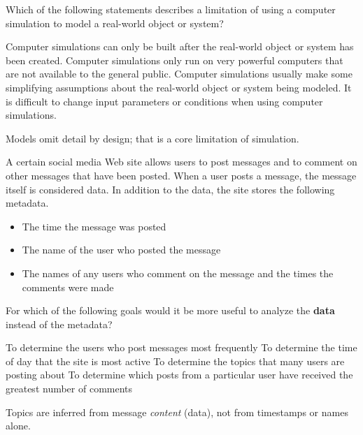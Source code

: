 \question[5]
Which of the following statements describes a limitation of using a computer simulation to model a real-world object or system?
\begin{choices}
  \choice Computer simulations can only be built after the real-world object or system has been created.
  \choice Computer simulations only run on very powerful computers that are not available to the general public.
  \CorrectChoice Computer simulations usually make some simplifying assumptions about the real-world object or system being modeled.
  \choice It is difficult to change input parameters or conditions when using computer simulations.
\end{choices}
\begin{solution}
  Models omit detail by design; that is a core limitation of simulation.
\end{solution}


\question[5]
A certain social media Web site allows users to post messages and to comment on other messages that have been posted. When a user posts a message, the message itself is considered data. In addition to the data, the site stores the following metadata.
\begin{itemize}
  \item The time the message was posted
  \item The name of the user who posted the message
  \item The names of any users who comment on the message and the times the comments were made
\end{itemize}
For which of the following goals would it be more useful to analyze the \textbf{data} instead of the metadata?
\begin{choices}
  \choice To determine the users who post messages most frequently
  \choice To determine the time of day that the site is most active
  \CorrectChoice To determine the topics that many users are posting about
  \choice To determine which posts from a particular user have received the greatest number of comments
\end{choices}
\begin{solution}
  Topics are inferred from message \emph{content} (data), not from timestamps or names alone.
\end{solution}

\newpage


